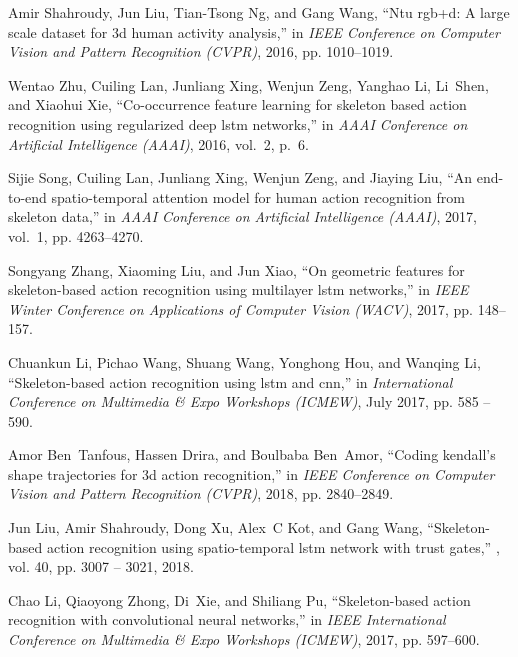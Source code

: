 \documentclass[conference]{IEEEtran}
\begin{document}
\begin{thebibliography}{10}
  Amir Shahroudy, Jun Liu, Tian-Tsong Ng, and Gang Wang,
  \newblock ``Ntu rgb+d: A large scale dataset for 3d human activity analysis,''
  \newblock in {\em IEEE Conference on Computer Vision and Pattern Recognition
    (CVPR)}, 2016, pp. 1010--1019.
  
  Wentao Zhu, Cuiling Lan, Junliang Xing, Wenjun Zeng, Yanghao Li, Li~Shen, and
    Xiaohui Xie,
  \newblock ``Co-occurrence feature learning for skeleton based action
    recognition using regularized deep lstm networks,''
  \newblock in {\em AAAI Conference on Artificial Intelligence (AAAI)}, 2016,
    vol.~2, p.~6.
  
  Sijie Song, Cuiling Lan, Junliang Xing, Wenjun Zeng, and Jiaying Liu,
  \newblock ``An end-to-end spatio-temporal attention model for human action
    recognition from skeleton data,''
  \newblock in {\em AAAI Conference on Artificial Intelligence (AAAI)}, 2017,
    vol.~1, pp. 4263--4270.
  
  Songyang Zhang, Xiaoming Liu, and Jun Xiao,
  \newblock ``On geometric features for skeleton-based action recognition using
    multilayer lstm networks,''
  \newblock in {\em IEEE Winter Conference on Applications of Computer Vision
    (WACV)}, 2017, pp. 148--157.
  
  Chuankun Li, Pichao Wang, Shuang Wang, Yonghong Hou, and Wanqing Li,
  \newblock ``Skeleton-based action recognition using lstm and cnn,''
  \newblock in {\em International Conference on Multimedia \& Expo Workshops
    (ICMEW)}, July 2017, pp. 585 -- 590.
  
  Amor Ben~Tanfous, Hassen Drira, and Boulbaba Ben~Amor,
  \newblock ``Coding kendall's shape trajectories for 3d action recognition,''
  \newblock in {\em IEEE Conference on Computer Vision and Pattern Recognition
    (CVPR)}, 2018, pp. 2840--2849.
  
  Jun Liu, Amir Shahroudy, Dong Xu, Alex~C Kot, and Gang Wang,
  \newblock ``Skeleton-based action recognition using spatio-temporal lstm
    network with trust gates,''
  , vol. 40, pp. 3007 -- 3021, 2018.
  
  Chao Li, Qiaoyong Zhong, Di~Xie, and Shiliang Pu,
  \newblock ``Skeleton-based action recognition with convolutional neural
    networks,''
  \newblock in {\em IEEE International Conference on Multimedia \& Expo Workshops
    (ICMEW)}, 2017, pp. 597--600.
  

\end{thebibliography}
\end{document}
